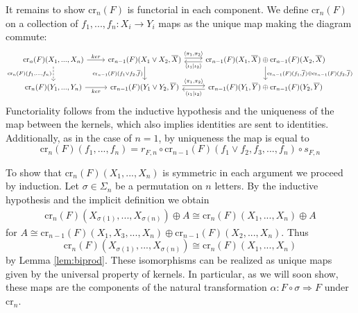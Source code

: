 It remains to show $\text{cr}_n(F)$ is functorial in each component. We define $\text{cr}_n(F)$ on a collection of $f_1,...,f_n:X_i\rightarrow Y_i$ maps as the unique map making the diagram commute:
\[\begin{tikzcd}
	{\text{cr}_n(F)(X_1,...,X_n)} & {\text{cr}_{n-1}(F)(X_1\lor X_2,\overline{X})} & {\text{cr}_{n-1}(F)(X_1,\overline{X})\oplus\text{cr}_{n-1}(F)(X_2,\overline{X})} \\
	{\text{cr}_n(F)(Y_1,...,Y_n)} & {\text{cr}_{n-1}(F)(Y_1\lor Y_2,\overline{Y})} & {\text{cr}_{n-1}(F)(Y_1,\overline{Y})\oplus\text{cr}_{n-1}(F)(Y_2,\overline{Y})}
	\arrow["ker", from=1-1, to=1-2]
	\arrow["{\text{cr}_n(F)(f_1,...,f_n)}"', dashed, from=1-1, to=2-1]
	\arrow["ker"', from=2-1, to=2-2]
	\arrow["{\text{cr}_{n-1}(F)(f_1\lor f_2,\overline{f})}"', from=1-2, to=2-2]
	\arrow["{\text{cr}_{n-1}(F)(f_1,\overline{f})\oplus\text{cr}_{n-1}(F)(f_2,\overline{f})}", from=1-3, to=2-3]
	\arrow["{\langle\pi_1,\pi_2\rangle}", shift left, from=1-2, to=1-3]
	\arrow["{\langle\iota_1|\iota_2\rangle}", shift left, from=1-3, to=1-2]
	\arrow["{\langle\pi_1,\pi_2\rangle}", shift left, from=2-2, to=2-3]
	\arrow["{\langle\iota_1|\iota_2\rangle}", shift left, from=2-3, to=2-2]
\end{tikzcd}\]
Functoriality follows from the inductive hypothesis and the uniqueness of the map between the kernels, which also implies identities are sent to identities. Additionally, as in the case of $n = 1$, by uniqueness the map is equal to
\begin{equation}\label{eq:projFormulaN}
    \text{cr}_n(F)(f_1,...,f_n) = r_{F,n}\circ \text{cr}_{n-1}(F)(f_1\lor f_2,f_3,...,f_n)\circ s_{F,n}
\end{equation}


To show that $\text{cr}_n(F)(X_1,...,X_n)$ is symmetric in each argument we proceed by induction. Let $\sigma \in \Sigma_n$ be a permutation on $n$ letters. By the inductive hypothesis and the implicit definition we obtain
\begin{align*}
    \text{cr}_n(F)(X_{\sigma(1)},...,X_{\sigma(n)})\oplus A \cong \text{cr}_n(F)(X_1,...,X_n)\oplus A
\end{align*}
for $A \cong \text{cr}_{n-1}(F)(X_1,X_3,...,X_n)\oplus\text{cr}_{n-1}(F)(X_2,...,X_n)$.  Thus 
\begin{equation}
    \text{cr}_n(F)(X_{\sigma(1)},...,X_{\sigma(n)})\cong \text{cr}_n(F)(X_1,...,X_n)
\end{equation}
by Lemma \ref{lem:biprod}. These isomorphisms can be realized as unique maps given by the universal property of kernels. In particular, as we will soon show, these maps are the components of the natural transformation $\alpha:F\circ \sigma\Rightarrow F$ under $\text{cr}_n$.


